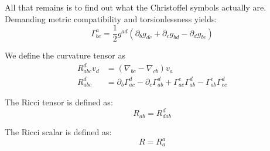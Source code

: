 All that remains is to find out what the Christoffel symbols actually are. Demanding metric compatibility and torsionlessness yields:
\begin{equation}
  \Gamma^a_{bc} = \frac{1}{2}g^{ad}
  \left( 
  \partial_b g_{dc} 
  +\partial_c g_{bd} 
  -\partial_d g_{bc} 
  \right)
  \label{eqn:dg:christoffel}
\end{equation}

We define the curvature tensor as
\begin{align}
  R^d_{abc} v_d &= \left( \nabla_{bc} - \nabla_{cb} \right) v_a
  \label{eqn:dg:riemann_def}\\
  R^d_{abc} &= \partial_b \Gamma^d_{ac} - \partial_c \Gamma^d_{ab} + \Gamma^e_{ac}\Gamma^d_{ab} - \Gamma^e_{ab}\Gamma^d_{ec}
\end{align}

The Ricci tensor is defined as:
\begin{equation}
  R_{ab} = R^d_{dab}
  \label{eqn:dg:ricci_tensor}
\end{equation}

The Ricci scalar is defined as:
\begin{equation}
  R = R^a_a
  \label{eqn:dg:ricci_scalar}
\end{equation}







